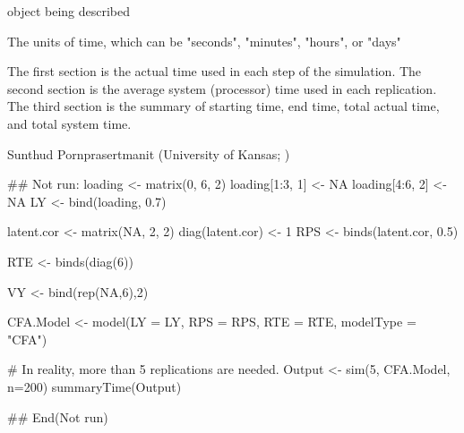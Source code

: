 \documentclass[a4paper]{book}
\begin{document}
%
\begin{Arguments}
\begin{ldescription}
\item[\code{object}] 
 object being described

\item[\code{units}] 
The units of time, which can be "seconds", "minutes", "hours", or "days"

\end{ldescription}
\end{Arguments}
%
\begin{Value}
The first section is the actual time used in each step of the simulation. The second section is the average system (processor) time used in each replication. The third section is the summary of starting time, end time, total actual time, and total system time.
\end{Value}
%
\begin{Author}\relax
Sunthud Pornprasertmanit (University of Kansas; )
\end{Author}
%
\begin{Examples}
\begin{ExampleCode}
## Not run: 
loading <- matrix(0, 6, 2)
loading[1:3, 1] <- NA
loading[4:6, 2] <- NA
LY <- bind(loading, 0.7)

latent.cor <- matrix(NA, 2, 2)
diag(latent.cor) <- 1
RPS <- binds(latent.cor, 0.5)

RTE <- binds(diag(6))

VY <- bind(rep(NA,6),2)

CFA.Model <- model(LY = LY, RPS = RPS, RTE = RTE, modelType = "CFA")

# In reality, more than 5 replications are needed.
Output <- sim(5, CFA.Model, n=200)
summaryTime(Output)

## End(Not run)
\end{ExampleCode}
\end{Examples}
\printindex{}
\end{document}
